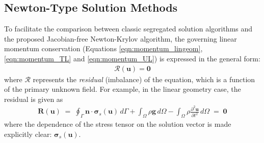 \documentclass[sn-mathphys,Numbered]{sn-jnl}%
\newcommand{\bb}{\boldsymbol}
\begin{document}
\subsection{Newton-Type Solution Methods}
To facilitate the comparison between classic segregated solution algorithms and the proposed Jacobian-free Newton-Krylov algorithm, the governing linear momentum conservation (Equations \ref{eqn:momentum_lingeom}, \ref{eqn:momentum_TL} and \ref{eqn:momentum_UL}) is expressed in the general form:
\begin{eqnarray} \label{eqn:residual}
	\mathcal{R}(\bb{u}) = \bb{0}
\end{eqnarray}
where $\mathcal{R}$ represents the \emph{residual} (imbalance) of the equation, which is a function of the primary unknown field.
For example, in the linear geometry case, the residual is given as
\begin{eqnarray}
    \bb{R}(\bb{u})
    \;=\;
    \oint_{\Gamma} \bb{n} \cdot \bb{\sigma}_s(\bb{u}) \,  d\Gamma
    + \int_{\Omega}  \rho \bb{g} \, d\Omega
    -  \int_{\Omega} \rho \frac{\partial^2 \bb{u} }{\partial t^2} \, d\Omega
    \;=\; \bb{0}
\end{eqnarray}
where the dependence of the stress tensor on the solution vector is made explicitly clear: $\bb{\sigma}_s(\bb{u})$.
\end{document}
